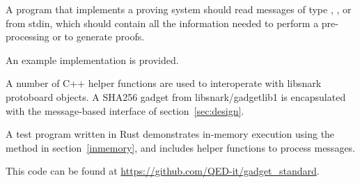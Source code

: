 A program that implements a proving system should read messages of type
, , or 
from stdin, which should contain all the information needed to perform a pre-processing or to generate proofs.



An example implementation is provided.

A number of C++ helper functions are used to interoperate
with libsnark protoboard objects.
A SHA256 gadget from libsnark/gadgetlib1
is encapsulated with the message-based interface of section~\ref{sec:design}.

A test program written in Rust demonstrates
in-memory execution using the method in section~\ref{inmemory},
and includes helper functions to process messages.

This code can be found at \href{https://github.com/QED-it/gadget\_standard}{https://github.com/QED-it/gadget\_standard}.
